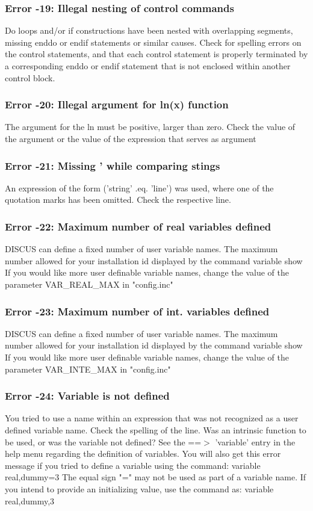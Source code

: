 \subsubsection{Error -19: Illegal nesting of control commands}
\par
Do  loops and/or if constructions have been nested with overlapping 
segments, missing enddo or endif statements or similar causes. Check 
for spelling errors on the control statements, and that each control 
statement is properly terminated by a corresponding enddo or endif 
statement that is not enclosed within another control block. 
\subsubsection{Error -20: Illegal argument for ln(x) function}
\par
The argument for the ln must be positive, larger than zero. Check the 
value of the argument or the value of the expression that serves as 
argument 
\subsubsection{Error -21: Missing ' while comparing stings}
\par
An expression of the form ('string' .eq. 'line') was used, where 
one of the quotation marks has been omitted. Check the respective 
line. 
\subsubsection{Error -22: Maximum number of real variables defined}
\par
DISCUS can define a fixed number of user variable names. The maximum 
number allowed for your installation id displayed by the command 
variable show 
If you would like more user definable variable names, change 
the value of the parameter VAR\_REAL\_MAX in "config.inc" 
\subsubsection{Error -23: Maximum number of int. variables defined}
\par
DISCUS can define a fixed number of user variable names. The maximum 
number allowed for your installation id displayed by the command 
variable show 
If you would like more user definable variable names, change 
the value of the parameter VAR\_INTE\_MAX in "config.inc" 
\subsubsection{Error -24: Variable is not defined}
\par
You tried to use a name within an expression that was not recognized 
as a user defined variable name. Check the spelling of the line. 
Was an intrinsic function to be used, or was the variable not 
defined? See the ==$> $ 'variable' entry in the help menu regarding 
the definition of variables. 
You will also get this error message if you tried to define a 
variable using the command: 
variable real,dummy=3 
The equal sign "=" may not be used as part of a variable name. If 
you intend to provide an initializing value, use the command as: 
variable real,dummy,3 
